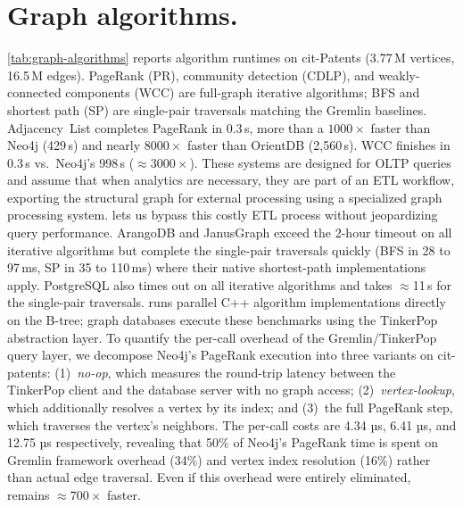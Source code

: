 \section{Graph algorithms.}
\label{sec:eval:property-graphalytics}
\autoref{tab:graph-algorithms} reports algorithm runtimes on cit-Patents (3.77\,M vertices, 16.5\,M edges).
PageRank (PR), community detection (CDLP), and weakly-connected components (WCC) are full-graph iterative algorithms; BFS and shortest path (SP) are single-pair traversals matching the Gremlin baselines.
\project{} Adjacency~List completes PageRank in 0.3\,s, more than a $1000\times$ faster than Neo4j (429\,s) and nearly $8000\times$ faster than OrientDB (2{,}560\,s).
WCC finishes in 0.3\,s vs.\ Neo4j's 998\,s ($\approx 3000\times$).
These systems are designed for OLTP queries and assume that when analytics are necessary, they are part of an ETL workflow, exporting the structural graph for external processing using a specialized graph processing system.
\project{} lets us bypass this costly ETL process without jeopardizing query performance.
ArangoDB and JanusGraph exceed the 2-hour timeout on all iterative algorithms but complete the single-pair traversals quickly (BFS in 28 to 97\,ms, SP in 35 to 110\,ms) where their native shortest-path implementations apply.
PostgreSQL also times out on all iterative algorithms and takes $\approx$11\,s for the single-pair traversals.
\project{} runs parallel C++ algorithm implementations directly on the \wt{} B-tree; graph databases execute these benchmarks using the TinkerPop abstraction layer. %
To quantify the per-call overhead of the Gremlin/TinkerPop query layer, we decompose Neo4j's PageRank execution into three variants on cit-patents:
(1)~\emph{no-op}, which measures the round-trip latency between the TinkerPop client and the database server with no graph access;
(2)~\emph{vertex-lookup}, which additionally resolves a vertex by its index; and
(3)~the full PageRank step, which traverses the vertex's neighbors.
The per-call costs are 4.34 µs, 6.41 µs, and 12.75 µs respectively, revealing that 50\% of Neo4j's PageRank time is spent on Gremlin framework overhead (34\%) and vertex index resolution (16\%) rather than actual edge traversal.
Even if this overhead were entirely eliminated, \project{} remains $\approx700\times$ faster.

